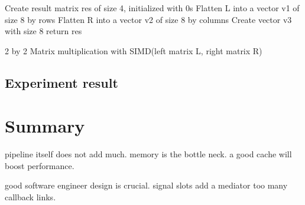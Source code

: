 \documentclass{sig-alternate}
\begin{document}
\begin{algorithm}[]
\SetAlgoLined
 Create result matrix res of size 4, initialized with 0s\;
 Flatten L into a vector v1 of size 8 by rows\;
 Flatten R into a vector v2 of size 8 by columns\;
Create vector v3 with size 8\;
 return res\;
 \caption{2 by 2 Matrix multiplication with SIMD(left matrix L, right matrix R)}
\end{algorithm}

\subsection{Experiment result}


\section{Summary}
pipeline itself does not add much. memory is the bottle neck. a good cache will boost performance.

good software engineer design is crucial. signal slots  add a mediator too many callback links.
\end{document}
